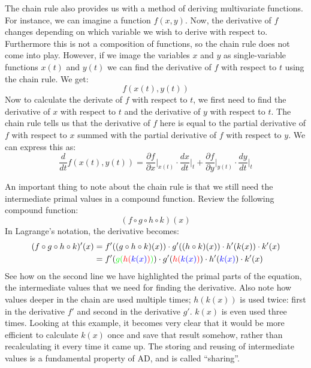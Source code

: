         The chain rule also provides us with a method of deriving multivariate functions.
        For instance, we can imagine a function $f(x,y)$.
        Now, the derivative of $f$ changes depending on which variable we wish to derive with respect to.
        Furthermore this is not a composition of functions, so the chain rule does not come into play.
        However, if we image the variables $x$ and $y$ as single-variable functions $x(t)$ and $y(t)$ we can find the derivative of $f$ with respect to $t$ using the chain rule.
        We get:
        \[f(x(t),y(t))\]
        Now to calculate the derivate of $f$ with respect to $t$, we first need to find the derivative of $x$ with respect to $t$ and the derivative of $y$ with respect to $t$.
        The chain rule tells us that the derivative of $f$ here is equal to the partial derivative of $f$ with respect to $x$ summed with the partial derivative of $f$ with respect to $y$.
        We can express this as:
        \[\frac{d}{dt}f(x(t),y(t))=\frac{\partial f}{\partial x}\biggr|_{x(t)}\cdot\frac{dx}{dt}\biggr|_t+\frac{\partial f}{\partial y}\biggr|_{y(t)}\cdot\frac{dy}{dt}\biggr|_t\]

        An important thing to note about the chain rule is that we still need the intermediate primal values in a compound function.
        Review the following compound function:
        \[(f\circ g\circ h\circ k)(x)\]
        In Lagrange's notation, the derivative becomes:
        \begin{align*}
            (f\circ g\circ h\circ k)'(x)&=f'((g\circ h\circ k)(x))\cdot g'((h\circ k)(x))\cdot h'(k(x))\cdot k'(x)\\
            &=f'({\color{green}g({\color{red}h({\color{blue}k(x)})})})\cdot g'({\color{red}h({\color{blue}k(x)})})\cdot h'({\color{blue}k(x)})\cdot k'(x)
        \end{align*}
        See how on the second line we have highlighted the primal parts of the equation, the intermediate values that we need for finding the derivative.
        Also note how values deeper in the chain are used multiple times; $h(k(x))$ is used twice: first in the derivative $f'$ and second in the derivative $g'$.
        $k(x)$ is even used three times.
        Looking at this example, it becomes very clear that it would be more efficient to calculate $k(x)$ once and save that result somehow, rather than recalculating it every time it came up.
        The storing and reusing of intermediate values is a fundamental property of AD, and is called ``sharing''.

